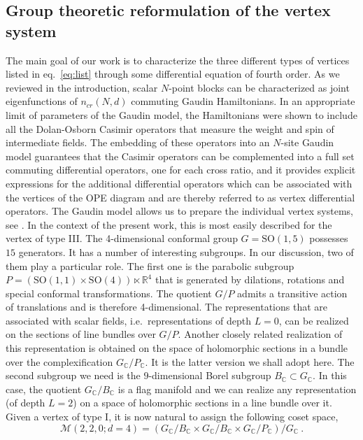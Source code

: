 \documentclass{article}
\def\bC{\mathbb{C}}
\begin{document}
\subsection{Group theoretic reformulation of the vertex system}  

The main goal of our work is to characterize the three different types of 
vertices listed in eq.\ \eqref{eq:list} through some differential equation of 
fourth order. As we reviewed in the introduction, scalar $N$-point blocks can 
be characterized as joint eigenfunctions of $n_{\textit{cr}}(N,d)$ commuting 
Gaudin Hamiltonians. In an appropriate limit of parameters of the Gaudin model, 
the Hamiltonians were shown to include all the Dolan-Osborn Casimir operators
that measure the weight and spin of intermediate fields. The embedding of these 
operators into an $N$-site Gaudin model guarantees that the Casimir operators 
can be complemented into a full set commuting differential operators, one for 
each cross ratio, and it provides explicit expressions for the additional 
differential operators which can be associated with the vertices of the 
OPE diagram and are thereby referred to as vertex differential operators.  
The Gaudin model allows us to prepare the individual vertex systems, see 
\cite{Buric:2021ywo}. In the context of the present work, this is most 
easily described for the vertex of type III. The 4-dimensional conformal group 
$G=\mathrm{SO}(1,5)$ possesses $15$ generators. It has a number of interesting 
subgroups. In our discussion, two of them play a particular role. The first one 
is the parabolic subgroup $P = (\mathrm{SO}(1,1) \times \mathrm{SO}(4)) \ltimes 
\mathbb{R}^4$ that is generated by dilations, rotations and special conformal 
transformations. The quotient $G/P$ admits a transitive action of translations 
and is therefore 4-dimensional. The representations that are associated with 
scalar fields, i.e.\ representations of depth $L=0$, can be realized on the 
sections of line bundles over $G/P$. Another closely related realization of 
this representation is obtained on the space of holomorphic sections in a 
bundle over the complexification $G_\bC/P_\bC$. It is the latter version we 
shall adopt here. The second subgroup we need is the $9$-dimensional 
Borel subgroup $B_\bC \subset G_\bC$. In this case, the quotient $G_\bC/B_\bC$ 
is a flag manifold and we can realize any representation (of depth $L = 2$) on a 
space of holomorphic sections in a line bundle over it. Given a vertex of 
type I, it is now natural to assign the following coset space, 
\begin{equation} \label{eq:triplecoset}
 \mathcal{M} (2,2,0;d=4) = \left(G_\bC/B_\bC \times G_\bC/B_\bC \times G_\bC/P_\bC
 \right)/G_\bC\ .
\end{equation} 
\end{document}
